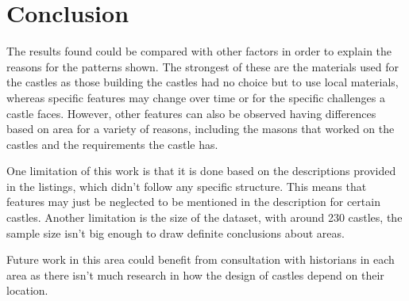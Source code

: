 \documentclass[11pt]{article}
\begin{document}
\section{Conclusion}

The results found could be compared with other factors in order to explain the reasons for the patterns shown. The strongest of these are the materials used for the castles as those building the castles had no choice but to use local materials, whereas specific features may change over time or for the specific challenges a castle faces. However, other features can also be observed having differences based on area for a variety of reasons, including the masons that worked on the castles and the requirements the castle has.

One limitation of this work is that it is done based on the descriptions provided in the listings, which didn't follow any specific structure. This means that features may just be neglected to be mentioned in the description for certain castles. Another limitation is the size of the dataset, with around 230 castles, the sample size isn't big enough to draw definite conclusions about areas.

Future work in this area could benefit from consultation with historians in each area as there isn't much research in how the design of castles depend on their location.



\newpage
\printbibliography


\end{document}
